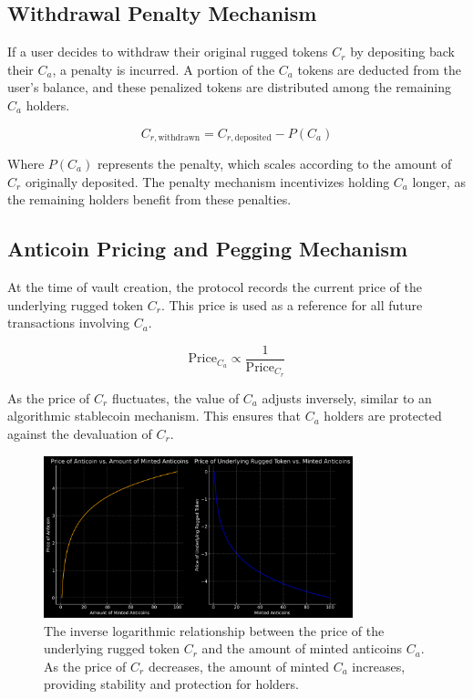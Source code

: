 \documentclass{article}
\begin{document}
\subsection{Withdrawal Penalty Mechanism}
If a user decides to withdraw their original rugged tokens $C_r$ by depositing back their $C_a$, a penalty is incurred. A portion of the $C_a$ tokens are deducted from the user's balance, and these penalized tokens are distributed among the remaining $C_a$ holders.

\begin{equation}
C_{r,\text{withdrawn}} = C_{r,\text{deposited}} - P(C_a)
\end{equation}

Where $P(C_a)$ represents the penalty, which scales according to the amount of $C_r$ originally deposited. The penalty mechanism incentivizes holding $C_a$ longer, as the remaining holders benefit from these penalties.










\subsection{Anticoin Pricing and Pegging Mechanism}
At the time of vault creation, the protocol records the current price of the underlying rugged token $C_r$. This price is used as a reference for all future transactions involving $C_a$.

\begin{equation}
\text{Price}_{C_a} \propto \frac{1}{\text{Price}_{C_r}}
\end{equation}

As the price of $C_r$ fluctuates, the value of $C_a$ adjusts inversely, similar to an algorithmic stablecoin mechanism. This ensures that $C_a$ holders are protected against the devaluation of $C_r$.

\begin{figure}[h]
\centering
\includegraphics[width=0.8\textwidth]{images/2.png}
\caption{The inverse logarithmic relationship between the price of the underlying rugged token $C_r$ and the amount of minted anticoins $C_a$. As the price of $C_r$ decreases, the amount of minted $C_a$ increases, providing stability and protection for holders.}
\label{fig:minted_anticoins}
\end{figure}
\end{document}
